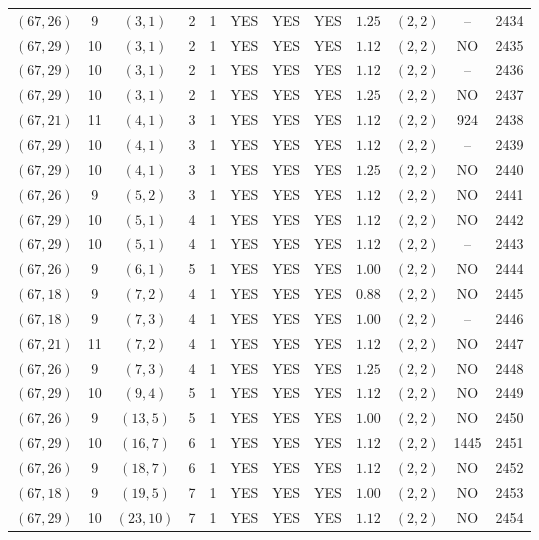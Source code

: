 \begin{longtable}{|c|c|c|c|c|c|c|c|c|c|c|c|}
$(67,26)$ & 9 & $(3,1)$ & 2 & 1 & YES & YES & YES & $1.25$ & $(2,2)$ & -- & 2434\\
$(67,29)$ & 10 & $(3,1)$ & 2 & 1 & YES & YES & YES & $1.12$ & $(2,2)$ & NO & 2435\\
$(67,29)$ & 10 & $(3,1)$ & 2 & 1 & YES & YES & YES & $1.12$ & $(2,2)$ & -- & 2436\\
$(67,29)$ & 10 & $(3,1)$ & 2 & 1 & YES & YES & YES & $1.25$ & $(2,2)$ & NO & 2437\\
$(67,21)$ & 11 & $(4,1)$ & 3 & 1 & YES & YES & YES & $1.12$ & $(2,2)$ & 924 & 2438\\
$(67,29)$ & 10 & $(4,1)$ & 3 & 1 & YES & YES & YES & $1.12$ & $(2,2)$ & -- & 2439\\
$(67,29)$ & 10 & $(4,1)$ & 3 & 1 & YES & YES & YES & $1.25$ & $(2,2)$ & NO & 2440\\
$(67,26)$ & 9 & $(5,2)$ & 3 & 1 & YES & YES & YES & $1.12$ & $(2,2)$ & NO & 2441\\
$(67,29)$ & 10 & $(5,1)$ & 4 & 1 & YES & YES & YES & $1.12$ & $(2,2)$ & NO & 2442\\
$(67,29)$ & 10 & $(5,1)$ & 4 & 1 & YES & YES & YES & $1.12$ & $(2,2)$ & -- & 2443\\
$(67,26)$ & 9 & $(6,1)$ & 5 & 1 & YES & YES & YES & $1.00$ & $(2,2)$ & NO & 2444\\
$(67,18)$ & 9 & $(7,2)$ & 4 & 1 & YES & YES & YES & $0.88$ & $(2,2)$ & NO & 2445\\
$(67,18)$ & 9 & $(7,3)$ & 4 & 1 & YES & YES & YES & $1.00$ & $(2,2)$ & -- & 2446\\
$(67,21)$ & 11 & $(7,2)$ & 4 & 1 & YES & YES & YES & $1.12$ & $(2,2)$ & NO & 2447\\
$(67,26)$ & 9 & $(7,3)$ & 4 & 1 & YES & YES & YES & $1.25$ & $(2,2)$ & NO & 2448\\
$(67,29)$ & 10 & $(9,4)$ & 5 & 1 & YES & YES & YES & $1.12$ & $(2,2)$ & NO & 2449\\
$(67,26)$ & 9 & $(13,5)$ & 5 & 1 & YES & YES & YES & $1.00$ & $(2,2)$ & NO & 2450\\
$(67,29)$ & 10 & $(16,7)$ & 6 & 1 & YES & YES & YES & $1.12$ & $(2,2)$ & 1445 & 2451\\
$(67,26)$ & 9 & $(18,7)$ & 6 & 1 & YES & YES & YES & $1.12$ & $(2,2)$ & NO & 2452\\
$(67,18)$ & 9 & $(19,5)$ & 7 & 1 & YES & YES & YES & $1.00$ & $(2,2)$ & NO & 2453\\
$(67,29)$ & 10 & $(23,10)$ & 7 & 1 & YES & YES & YES & $1.12$ & $(2,2)$ & NO & 2454\\

\end{longtable}
